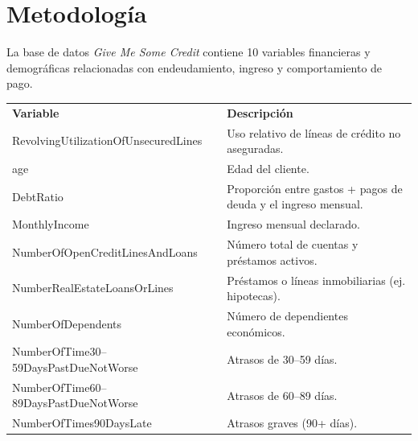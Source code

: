 \documentclass[10pt]{beamer}
\begin{document}
\section{Metodología}
\begin{frame}

La base de datos \textit{Give Me Some Credit} contiene 10 variables financieras y demográficas
relacionadas con endeudamiento, ingreso y comportamiento de pago.

\vspace{0.3cm}

\small
{}
\setlength{\tabcolsep}{6pt}
\renewcommand{\arraystretch}{1.2}

\begin{table}[H]
\centering
\begin{tabular}{p{4cm} p{6.5cm}}
\rowcolor{Accent!40}
\textbf{Variable} & \textbf{Descripción} \\

RevolvingUtilizationOfUnsecuredLines & Uso relativo de líneas de crédito no aseguradas. \\

age & Edad del cliente. \\

DebtRatio & Proporción entre gastos + pagos de deuda y el ingreso mensual. \\

MonthlyIncome & Ingreso mensual declarado. \\

NumberOfOpenCreditLinesAndLoans & Número total de cuentas y préstamos activos. \\

NumberRealEstateLoansOrLines & Préstamos o líneas inmobiliarias (ej. hipotecas). \\

NumberOfDependents & Número de dependientes económicos. \\

NumberOfTime30--59DaysPastDueNotWorse & Atrasos de 30–59 días. \\

NumberOfTime60--89DaysPastDueNotWorse & Atrasos de 60–89 días. \\

NumberOfTimes90DaysLate & Atrasos graves (90+ días). \\

\end{tabular}
\end{table}

\end{frame}
\end{document}
